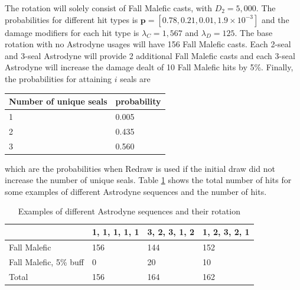 \documentclass{article}
\begin{document}
    The rotation will solely consist of Fall Malefic casts, with $D_2 = 5,000$. The probabilities for different hit types is $\textbf{p} = [0.78, 0.21, 0.01, 1.9 \times 10^{-3}]$ and the damage modifiers for each hit type is $\lambda_C = 1,567$ and $\lambda_D = 125$. The base rotation with no Astrodyne usages will have 156 Fall Malefic casts. Each 2-seal and 3-seal Astrodyne will provide 2 additional Fall Malefic casts and each 3-seal Astrodyne will increase the damage dealt of 10 Fall Malefic hits by 5\%. Finally, the probabilities for attaining $i$ seals are
    \begin{table}[H]
        \centering
        \begin{tabular}{@{}ll@{}}
        \toprule
        Number of unique seals & probability \\ \midrule
        1                      & 0.005       \\
        2                      & 0.435       \\
        3                      & 0.560       \\ \bottomrule
        \end{tabular}
    \end{table}
    which are the probabilities when Redraw is used if the initial draw did not increase the number of unique seals. Table \ref{t:astrodyne-seq} shows the total number of hits for some examples of different Astrodyne sequences and the number of hits.
    \begin{table}[H]
        \caption{Examples of different Astrodyne sequences and their rotation}\label{t:astrodyne-seq}
        \centering
        \begin{tabular}{@{}llll@{}}
        \toprule
                    & 1, 1, 1, 1, 1 & 3, 2, 3, 1, 2 & 1, 2, 3, 2, 1 \\ \midrule
        Fall Malefic           & 156           & 144           & 152           \\
        Fall Malefic, 5\% buff & 0             & 20            & 10            \\ \midrule
        Total                  & 156           & 164           & 162           \\ \bottomrule        
        \end{tabular}
    \end{table}
\end{document}
